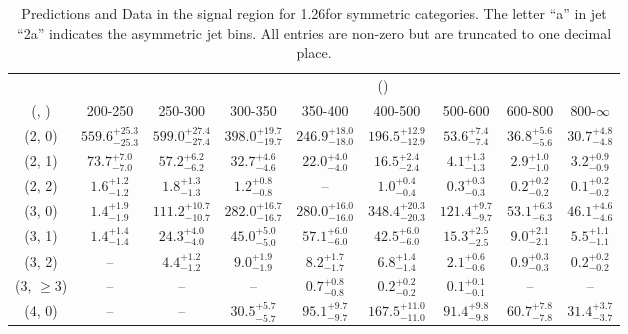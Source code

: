 \begin{table}[h!]
\tiny
\centering
\caption{Predictions and Data in the signal region for 1.26\ifb for symmetric categories. The letter ``a'' in jet \eg ``2a''  indicates the asymmetric jet bins. All entries are non-zero but are truncated to one decimal place.\label{tab:yieldsseppost_sig_ewk_sym}}
\begin{tabular}
{ccccccccc}
	\hline\hline
&	& \multicolumn{8}{c}{\scalht (\gev)} \\ 
	 (\njet,  \nb) & 200-250 & 250-300 & 300-350 & 350-400 & 400-500 & 500-600 & 600-800 & 800-$\infty$ \\ [0.8ex] 
\hline
	(2, 0) & $559.6^{+ 25.3 }_{- 25.3 }$ & $599.0^{+ 27.4 }_{- 27.4 }$ & $398.0^{+ 19.7 }_{- 19.7 }$ & $246.9^{+ 18.0 }_{- 18.0 }$ & $196.5^{+ 12.9 }_{- 12.9 }$ & $53.6^{+ 7.4 }_{- 7.4 }$ & $36.8^{+ 5.6 }_{- 5.6 }$ & $30.7^{+ 4.8 }_{- 4.8 }$ \\[0.5ex] 
	(2, 1) & $73.7^{+ 7.0 }_{- 7.0 }$ & $57.2^{+ 6.2 }_{- 6.2 }$ & $32.7^{+ 4.6 }_{- 4.6 }$ & $22.0^{+ 4.0 }_{- 4.0 }$ & $16.5^{+ 2.4 }_{- 2.4 }$ & $4.1^{+ 1.3 }_{- 1.3 }$ & $2.9^{+ 1.0 }_{- 1.0 }$ & $3.2^{+ 0.9 }_{- 0.9 }$ \\[0.5ex] 
	(2, 2) & $1.6^{+ 1.2 }_{- 1.2 }$ & $1.8^{+ 1.3 }_{- 1.3 }$ & $1.2^{+ 0.8 }_{- 0.8 }$ & -- & $1.0^{+ 0.4 }_{- 0.4 }$ & $0.3^{+ 0.3 }_{- 0.3 }$ & $0.2^{+ 0.2 }_{- 0.2 }$ & $0.1^{+ 0.2 }_{- 0.2 }$ \\[0.5ex] 
	(3, 0) & $1.4^{+ 1.9 }_{- 1.9 }$ & $111.2^{+ 10.7 }_{- 10.7 }$ & $282.0^{+ 16.7 }_{- 16.7 }$ & $280.0^{+ 16.0 }_{- 16.0 }$ & $348.4^{+ 20.3 }_{- 20.3 }$ & $121.4^{+ 9.7 }_{- 9.7 }$ & $53.1^{+ 6.3 }_{- 6.3 }$ & $46.1^{+ 4.6 }_{- 4.6 }$ \\[0.5ex] 
	(3, 1) & $1.4^{+ 1.4 }_{- 1.4 }$ & $24.3^{+ 4.0 }_{- 4.0 }$ & $45.0^{+ 5.0 }_{- 5.0 }$ & $57.1^{+ 6.0 }_{- 6.0 }$ & $42.5^{+ 6.0 }_{- 6.0 }$ & $15.3^{+ 2.5 }_{- 2.5 }$ & $9.0^{+ 2.1 }_{- 2.1 }$ & $5.5^{+ 1.1 }_{- 1.1 }$ \\[0.5ex] 
	(3, 2) & -- & $4.4^{+ 1.2 }_{- 1.2 }$ & $9.0^{+ 1.9 }_{- 1.9 }$ & $8.2^{+ 1.7 }_{- 1.7 }$ & $6.8^{+ 1.4 }_{- 1.4 }$ & $2.1^{+ 0.6 }_{- 0.6 }$ & $0.9^{+ 0.3 }_{- 0.3 }$ & $0.2^{+ 0.2 }_{- 0.2 }$ \\[0.5ex] 
	(3, $\ge3$) & -- & -- & -- & $0.7^{+ 0.8 }_{- 0.8 }$ & $0.2^{+ 0.2 }_{- 0.2 }$ & $0.1^{+ 0.1 }_{- 0.1 }$ & -- & -- \\[0.5ex] 
	(4, 0) & -- & -- & $30.5^{+ 5.7 }_{- 5.7 }$ & $95.1^{+ 9.7 }_{- 9.7 }$ & $167.5^{+ 11.0 }_{- 11.0 }$ & $91.4^{+ 9.8 }_{- 9.8 }$ & $60.7^{+ 7.8 }_{- 7.8 }$ & $31.4^{+ 3.7 }_{- 3.7 }$ \\[0.5ex] 

\end{tabular}
\end{table}
